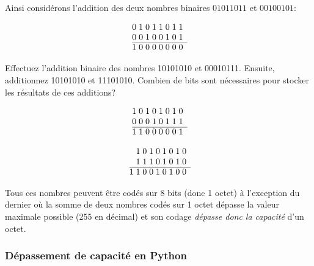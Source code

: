 \documentclass[12pt]{article}
\newenvironment{MaReponse}
		{\begin{greyedtextbox}\itshape} %
		{\end{greyedtextbox}}            %
\begin{document}
	Ainsi considérons l'addition des deux nombres binaires \(01011011\) et \(00100101\):
	 
	 \[
	 \begin{array}{@{}r *{8}{@{\;}c}}
	 	& 0 & 1 & 0 & 1 & 1 & 0 & 1 & 1 \\
	 	& 0 & 0 & 1 & 0 & 0 & 1 & 0 & 1 \\
	 	\cline{2-9}
	 	& 1 & 0 & 0 & 0 & 0 & 0 & 0 & 0 \\
	 \end{array}
	 \]
	 
	  \begin{MonExo}
	 	Effectuez l'addition binaire des nombres 10101010 et 00010111. Ensuite, additionnez 10101010 et 11101010. Combien de bits sont nécessaires pour stocker les résultats de ces additions?
	 \end{MonExo}
	 \begin{MaReponse}
	 	\begin{minipage}{0.45\textwidth}
	 		\[
	 		\begin{array}{@{}r *{8}{@{\;}c}}
	 			& 1 & 0 & 1 & 0 & 1 & 0 & 1 & 0 \\
	 			& 0 & 0 & 0 & 1 & 0 & 1 & 1 & 1 \\
	 			\cline{2-9}
	 			& 1 & 1 & 0 & 0 & 0 & 0 & 0 & 1 \\
	 		\end{array}
	 		\]
	 	\end{minipage}\hfill
	 	\begin{minipage}{0.45\textwidth}
	 		\[
	 		\begin{array}{@{}r *{9}{@{\;}c}}
	 			&& 1 & 0 & 1 & 0 & 1 & 0 & 1 & 0 \\
	 			&& 1 & 1 & 1 & 0 & 1 & 0 & 1 & 0 \\
	 			\cline{2-10}
	 			& 1 & 1 & 0 & 0 & 1 & 0 & 1 & 0 & 0 \\
	 		\end{array}
	 		\]
	 	\end{minipage}
	 	
	 	Tous ces nombres peuvent être codés sur 8 bits (donc 1 octet) à l'exception du dernier où la somme de deux nombres codés sur 1 octet dépasse la valeur maximale possible (255 en décimal) et son codage \emph{dépasse donc la capacité} d'un octet.
	 \end{MaReponse}

	\subsubsection*{Dépassement de capacité en Python}
	
\end{document}

